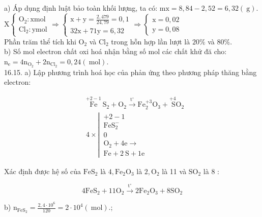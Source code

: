 \documentclass[10pt]{article}
\begin{document}
a) Áp dụng định luật bảo toàn khối lượng, ta có: $\mathrm{mx}=8,84-2,52=6,32(\mathrm{~g})$.\\
$\mathrm{X}\left\{\begin{array}{l}\mathrm{O}_{2}: \mathrm{x} \mathrm{mol} \\ \mathrm{Cl}_{2}: \mathrm{y} \mathrm{mol}\end{array} \Rightarrow\left\{\begin{array}{l}\mathrm{x}+\mathrm{y}=\frac{2,479}{24,79}=0,1 \\ 32 \mathrm{x}+71 \mathrm{y}=6,32\end{array} \Rightarrow\left\{\begin{array}{l}\mathrm{x}=0,02 \\ \mathrm{y}=0,08\end{array}\right.\right.\right.$\\
Phần trăm thể tích khi $\mathrm{O}_{2}$ và $\mathrm{Cl}_{2}$ trong hỗn hợp lần lượt là $20 \%$ và $80 \%$.\\
b) Số mol electron chất oxi hoá nhận bằng số mol các chất khử đă cho: $\mathrm{n}_{\mathrm{e}}=4 \mathrm{n}_{\mathrm{O}_{2}}+2 \mathrm{n}_{\mathrm{Cl}_{2}}=0,24(\mathrm{~mol})$.\\
16.15. a) Lập phương trình hoá học của phản ứng theo phương pháp thăng bằng electron:

$$
\begin{aligned}
& \stackrel{+2-1}{\mathrm{Fe}} \mathrm{~S}_{2}+\mathrm{O}_{2} \xrightarrow{\mathrm{t}^{\circ}} \mathrm{Fe}_{2}^{+3} \mathrm{O}_{3}+\stackrel{+4}{\mathrm{~S}} \mathrm{O}_{2} \\
& 4 \times \left\lvert\, \begin{array}{l}
+2-1 \\
\mathrm{FeS}_{2}^{-} \\
0 \\
\mathrm{O}_{2}+4 \mathrm{e} \longrightarrow \\
\mathrm{Fe}+2 \mathrm{~S}+1 \mathrm{e}
\end{array}\right.
\end{aligned}
$$

Xác định được hệ số của $\mathrm{FeS}_{2}$ là $4, \mathrm{Fe}_{2} \mathrm{O}_{3}$ là $2, \mathrm{O}_{2}$ là 11 và $\mathrm{SO}_{2}$ là 8 :

$$
4 \mathrm{FeS}_{2}+11 \mathrm{O}_{2} \xrightarrow{\mathrm{t}^{\circ}} 2 \mathrm{Fe}_{2} \mathrm{O}_{3}+8 \mathrm{SO}_{2}
$$

b) $\mathrm{n}_{\mathrm{FeS}_{2}}=\frac{2,4 \cdot 10^{6}}{120}=2 \cdot 10^{4}(\mathrm{~mol})$.;
\end{document}
